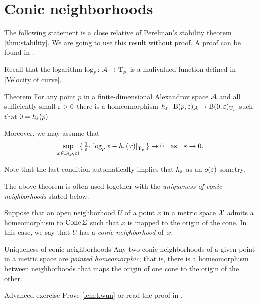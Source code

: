 \section{Conic neighborhoods}

The following statement is a close relative of Perelman's stability theorem \ref{thm:stability}.
We are going to use this result without proof.
A proof can be found in \cite{perelman1993}.

Recall that the logarithm $\log_p\colon\mathcal{A}\to \mathrm{T}_p$ is a mulivalued function defined in \ref{Velocity of curve}.

\begin{thm}{Theorem}\label{thm:spherical-nbhd}
For any point $p$ in a finite-dimensional Alexandrov space $\mathcal{A}$
and all sufficiently small $\varepsilon>0$
there is a homeomorphism $h_\varepsilon\colon\mathrm{B}{}(p,\varepsilon)_{\mathcal{A}}\to \mathrm{B}{}(0,\varepsilon)_{\mathrm{T}_p}$ such that $0=h_\varepsilon(p)$.

Moreover, we may assume that
\[
\sup_{x\in \oBall(p,\eps)}\{\,\tfrac1\eps\cdot\dist{\log_px}{h_\eps(x)}{\T_p}\,\}\to 0
\quad\text{as}\quad
\eps\to 0.\]
\end{thm}

Note that the last condition automatically implies that $h_\varepsilon$ as an $o(\varepsilon)$-sometry.

The above theorem is often used together with the \textit{uniqueness of conic neighborhoods} stated below.

Suppose that an open  neighborhood $U$ of a point $x$ in a metric space $\mathcal{X}$
admits a homeomorphism to $\mathop{\rm Cone}\nolimits\Sigma$ such that $x$ is mapped to the origin of the cone.
In this case, we say that $U$ has a \emph{conic neighborhood} of~$x$.

\begin{thm}{Uniqueness of conic neighborhoods}\label{lem:kwun}
Any two conic neighborhoods of a given point in a metric space are \emph{pointed homeomorphic}; that is, there is a homeomorphism between neighborhoods that maps the origin of one cone to the origin of the other.
\end{thm}

\begin{thm}{Advanced exercise}\label{ex:conic}
Prove \ref{lem:kwun} or read the proof in \cite{kwun1964}.
\end{thm}


